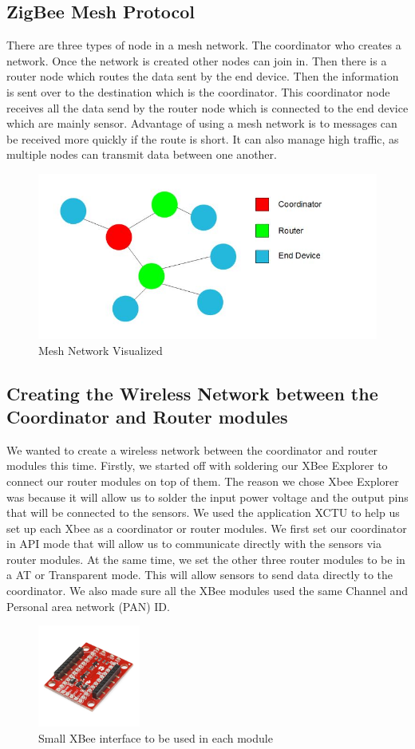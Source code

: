 \subsection{ZigBee Mesh Protocol}
	\par There are three types of node in a mesh network. The coordinator who creates a network. Once the network is created other nodes can join in. Then there is a router node which routes the data sent by the end device. Then the information is sent over to the destination which is the coordinator. This coordinator node receives all the data send by the router node which is connected to the end device which are mainly sensor. Advantage of using a mesh network is to messages can be received more quickly if the route is short. It can also manage high traffic, as multiple nodes can transmit data between one another. 
	\begin{figure}
		\centering
		\includegraphics[width=0.5\linewidth]{mesh.jpg}
		\caption{Mesh Network Visualized}
		\label{fig:mesh}
	\end{figure}
	\subsection{Creating the Wireless Network between the Coordinator and Router modules}
	\par We wanted to create a wireless network between the coordinator and router modules this time. Firstly, we started off with soldering our XBee Explorer to connect our router modules on top of them. The reason we chose Xbee Explorer was because it will allow us to solder the input power voltage and the output pins that will be connected to the sensors. We used the application XCTU to help us set up each Xbee as a coordinator or router modules. We first set our coordinator in API mode that will allow us to communicate directly with the sensors via router modules. At the same time, we set the other three router modules to be in a AT or Transparent mode. This will allow sensors to send data directly to the coordinator. We also made sure all the XBee modules used the same Channel and Personal area network (PAN) ID. 
	\begin{figure}[h]
		\centering
		\includegraphics[width = 0.3\textwidth]{xbeeMiniExplorer.png}
		\caption{Small XBee interface to be used in each module}
	\end{figure}
